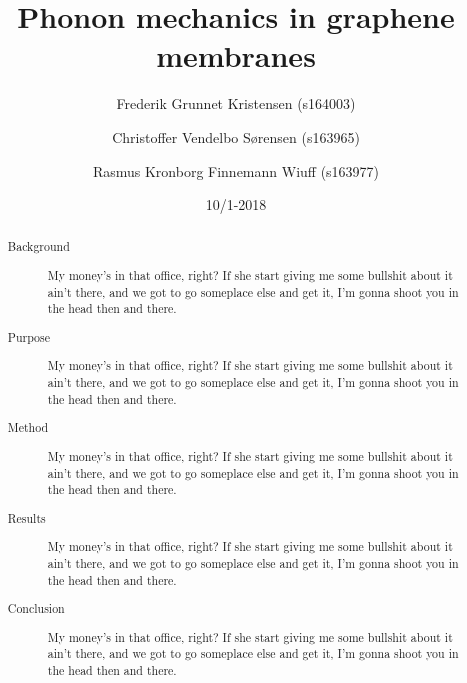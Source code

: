 



\begin{abstract}
  \begin{description}
    \item[Background] My money's in that office, right? If she start giving me some bullshit about it ain't there, and we got to go someplace else and get it, I'm gonna shoot you in the head then and there.
    \item[Purpose] My money's in that office, right? If she start giving me some bullshit about it ain't there, and we got to go someplace else and get it, I'm gonna shoot you in the head then and there.
    \item[Method] My money's in that office, right? If she start giving me some bullshit about it ain't there, and we got to go someplace else and get it, I'm gonna shoot you in the head then and there.
    \item[Results] My money's in that office, right? If she start giving me some bullshit about it ain't there, and we got to go someplace else and get it, I'm gonna shoot you in the head then and there.
    \item[Conclusion] My money's in that office, right? If she start giving me some bullshit about it ain't there, and we got to go someplace else and get it, I'm gonna shoot you in the head then and there.
  \end{description}
\end{abstract}

\title{Phonon mechanics in graphene membranes}
\date{10/1-2018}
\author{Frederik Grunnet Kristensen (s164003)}
\author{Christoffer Vendelbo Sørensen (s163965)}
\author{Rasmus Kronborg Finnemann Wiuff (s163977)}

\maketitle


\tableofcontents
\thispagestyle{empty}
\newpage
\setcounter{page}{1}


\newpage




\newpage
\listoffigures
\listoftables
\newpage


